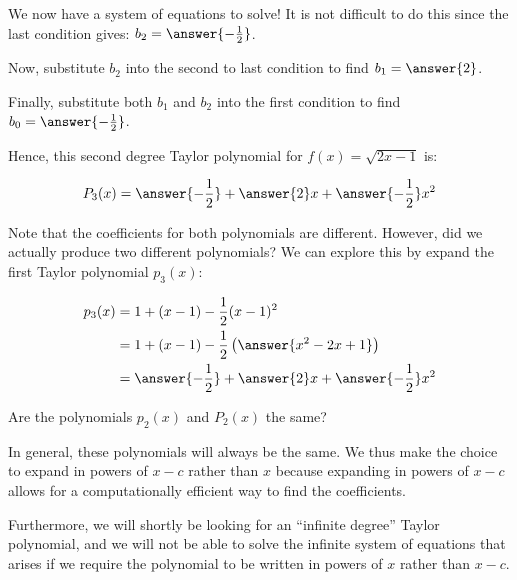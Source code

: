 \documentclass{ximera}
\begin{document}
\begin{exercise}
\begin{exercise}
\begin{exercise}
\begin{exercise}
We now have a system of equations to solve!  It is not difficult to do this since the last condition gives: $b_2 = \answer{-\frac{1}{2}}$.

Now, substitute $b_2$ into the second to last condition to find $b_1 = \answer{2}$. 

Finally, substitute both $b_1$ and $b_2$ into the first condition to find $b_0 = \answer{-\frac{1}{2}}$.

Hence, this second degree Taylor polynomial for $f(x) =\sqrt{2x-1}$ is:

\begin{align*}
P_3(x) &= \answer{-\frac{1}{2}}+\answer{2}x+\answer{-\frac{1}{2}}x^2\\
\end{align*}


Note that the coefficients for both polynomials are different.  However, did we actually produce two different polynomials?  We can explore this by expand the first Taylor polynomial $p_3(x)$:

\begin{align*}
p_3(x) &=1+(x-1)-\frac{1}{2}(x-1)^2\\
&=1+(x-1)-\frac{1}{2} \left(\answer{x^2-2x+1}\right)\\
&= \answer{-\frac{1}{2}}+\answer{2}x+\answer{-\frac{1}{2}}x^2
\end{align*}

Are the polynomials $p_2(x)$ and $P_2(x)$ the same?

\begin{multipleChoice}
\end{multipleChoice}

\begin{feedback}[correct]
\begin{remark}
In general, these polynomials will always be the same.  We thus make the choice to expand in powers of $x-c$ rather than $x$ because expanding in powers of $x-c$ allows for a computationally efficient way to find the coefficients.  

Furthermore, we will shortly be looking for an ``infinite degree'' Taylor polynomial, and we will not be able to solve the infinite system of equations that arises if we require the polynomial to be written in powers of $x$ rather than $x-c$.
\end{remark}

\end{feedback}
\end{exercise}

\end{exercise}

\end{exercise}
\end{exercise}
\end{document}
